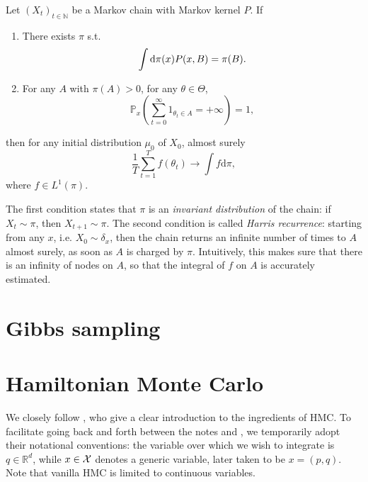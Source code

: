 \begin{proposition}
    Let $(X_t)_{t\in\mathbb N}$ be a Markov chain with Markov kernel $P$.
    If
    \begin{enumerate}
      \item There exists $\pi$ s.t. 
      $$
      \int \mathrm{d}\pi(x) P(x, B) = \pi(B).
      $$
      \item For any $A$ with $\pi(A)>0$, for any $\theta\in \Theta$,
      $$ 
      \mathbb{P}_{x} \left(\sum_{t=0}^\infty 1_{\theta_t\in A} = +\infty\right) = 1,
      $$
    \end{enumerate}
    then for any initial distribution $\mu_0$ of $X_0$, almost surely
    $$
    \frac{1}{T} \sum_{t=1}^T f(\theta_t) \rightarrow \int f\mathrm{d}\pi,
    $$
    where $f\in L^1(\pi)$. 
\end{proposition}
The first condition states that $\pi$ is an \emph{invariant distribution} of the chain: if $X_t\sim\pi$, then $X_{t+1}\sim\pi$. 
The second condition is called \emph{Harris recurrence}: starting from any $x$, i.e. $X_0\sim\delta_{x}$, then the chain returns an infinite number of times to $A$ almost surely, as soon as $A$ is charged by $\pi$. 
Intuitively, this makes sure that there is an infinity of nodes on $A$, so that the integral of $f$ on $A$ is accurately estimated.

\section{Gibbs sampling}

\section{Hamiltonian Monte Carlo}
We closely follow \cite{BoSa18}, who give a clear introduction to the ingredients of HMC.
To facilitate going back and forth between the notes and \citep{BoSa18}, we temporarily adopt their notational conventions: the variable over which we wish to integrate is $q\in\mathbb{R}^d$, while $x\in\mathcal{X}$ denotes a generic variable, later taken to be $x=(p,q)$.
Note that vanilla HMC is limited to continuous variables.

